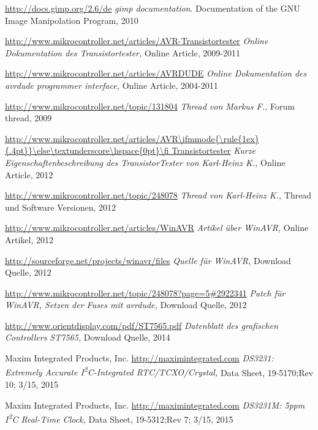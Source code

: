 \documentclass[pdftex,12pt,a4paper,oneside,english]{report}
\DeclareRobustCommand{\_}{\ifmmode{\rule{1ex}{.4pt}}\else\textunderscore\hspace{0pt}\fi}
\begin{document}
\begin{thebibliography}{99}
\url{http://docs.gimp.org/2.6/de}
\emph{gimp documentation}.
Documentation of the GNU Image Manipolation Program,
2010

\url{http://www.mikrocontroller.net/articles/AVR-Transistortester}
\emph{Online Dokumentation des Transistortester,}
Online Article,
2009-2011

\url{http://www.mikrocontroller.net/articles/AVRDUDE}
\emph{Online Dokumentation des avrdude programmer interface,}
Online Article,
2004-2011

\url{http://www.mikrocontroller.net/topic/131804}
\emph{Thread von Markus F.,}
Forum thread, 
2009

\url{http://www.mikrocontroller.net/articles/AVR\_Transistortester}
\emph{Kurze Eigenschaftenbeschreibung des TransistorTester von Karl-Heinz K.,}
Online Article,
2012

\url{http://www.mikrocontroller.net/topic/248078}
\emph{Thread von Karl-Heinz K.,}
Thread und Software Versionen,
2012

\url{http://www.mikrocontroller.net/articles/WinAVR}
\emph{Artikel über WinAVR,}
Online Artikel,
2012

\url{http://sourceforge.net/projects/winavr/files}
\emph{Quelle für WinAVR,}
Download Quelle,
2012

\url{http://www.mikrocontroller.net/topic/248078?page=5#2922341}
\emph{Patch für WinAVR, Setzen der Fuses mit avrdude,}
Download Quelle,
2012

\url{http://www.orientdisplay.com/pdf/ST7565.pdf}
\emph{Datenblatt des grafischen Controllers ST7565,}
Download Quelle,
2014

Maxim Integrated Products, Inc.
\url{http://maximintegrated.com}
\emph{DS3231: Extremely Accurate I\textsuperscript{2}C-Integrated RTC/TCXO/Crystal,}
Data Sheet,
19-5170;Rev 10; 3/15,
2015

Maxim Integrated Products, Inc.
\url{http://maximintegrated.com}
\emph{DS3231M: 5ppm I\textsuperscript{2}C Real-Time Clock,}
Data Sheet,
19-5312;Rev 7; 3/15,
2015


\end{thebibliography}
\end{document}
